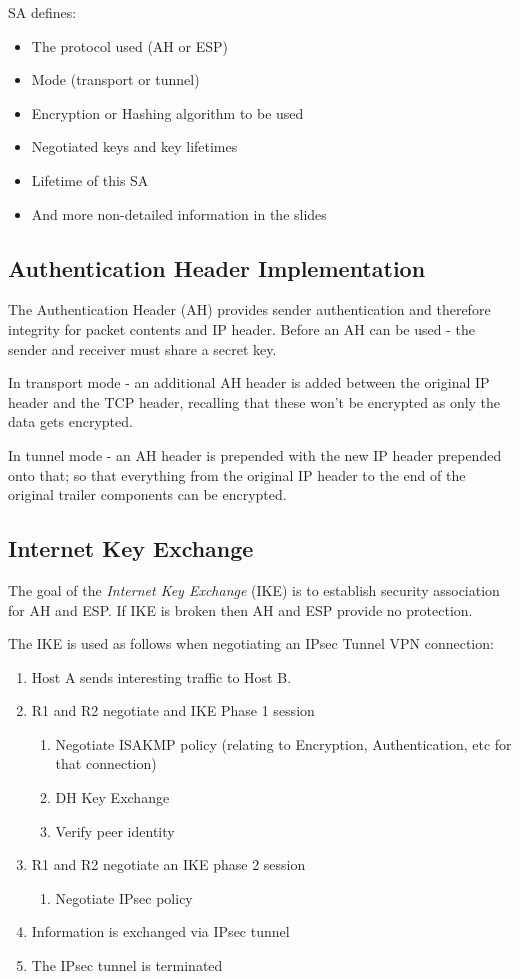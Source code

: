 SA defines:
\begin{itemize}
    \item The protocol used (AH or ESP)
    \item Mode (transport or tunnel)
    \item Encryption or Hashing algorithm to be used
    \item Negotiated keys and key lifetimes
    \item Lifetime of this SA
    \item And more non-detailed information in the slides
\end{itemize}

\subsection{Authentication Header Implementation}
The Authentication Header (AH) provides sender authentication and therefore integrity for packet contents and IP header. Before an AH can be used - the sender and receiver must share a secret key.

In transport mode - an additional AH header is added between the original IP header and the TCP header, recalling that these won't be encrypted as only the data gets encrypted.

In tunnel mode - an AH header is prepended with the new IP header prepended onto that; so that everything from the original IP header to the end of the original trailer components can be encrypted.

\subsection{Internet Key Exchange}
The goal of the \textit{Internet Key Exchange} (IKE) is to establish security association for AH and ESP. If IKE is broken then AH and ESP provide no protection. 

The IKE is used as follows when negotiating an IPsec Tunnel VPN connection:
\begin{enumerate}
    \item Host A sends interesting traffic to Host B.
    \item R1 and R2 negotiate and IKE Phase 1 session
    \begin{enumerate}
        \item Negotiate ISAKMP policy (relating to Encryption, Authentication, etc for that connection)
        \item DH Key Exchange
        \item Verify peer identity
    \end{enumerate}
    \item R1 and R2 negotiate an IKE phase 2 session
    \begin{enumerate}
        \item Negotiate IPsec policy
    \end{enumerate}
    \item Information is exchanged via IPsec tunnel
    \item The IPsec tunnel is terminated
\end{enumerate}


